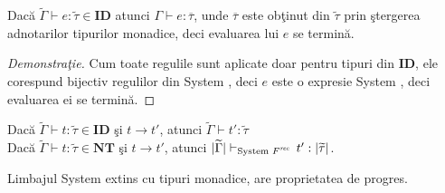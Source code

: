 \begin{corollary}
Dac\u a $\widetilde{\Gamma} \vdash e : \widetilde{\tau} \in \textbf{ID}$ atunci $\Gamma \vdash e : \overline{\tau}$, unde $\overline{\tau}$ este ob\c tinut din $\widetilde{\tau}$ prin \c stergerea adnotarilor tipurilor monadice, deci evaluarea lui $e$ se termin\u a.
\end{corollary}
\begin{proof}[Demonstra\c tie]
Cum toate regulile sunt aplicate doar pentru tipuri din \textbf{ID}, ele corespund bijectiv regulilor din System \fhat, deci $e$ este o expresie System \fhat, deci evaluarea ei se termin\u a.
\end{proof}
\begin{corollary}[Conservare]
Dac\u a $\widetilde{\Gamma} \vdash t : \widetilde{\tau} \in \textbf{ID}$ \c si $t \to t'$, atunci $\widetilde{\Gamma} \vdash t' : \widetilde{\tau}$ \\
Dac\u a $\widetilde{\Gamma} \vdash t : \widetilde{\tau} \in \textbf{NT}$ \c si $t \to t'$, atunci $|\widetilde{\Gamma}| \vdash_{\text{System $F^{\emph{rec}}\hspace{2pt}$}} t' : |\widetilde{\tau}|$.
\end{corollary}
\begin{proposition}[Progres]
Limbajul System \fhat extins cu tipuri monadice, are proprietatea de progres.
\end{proposition}

